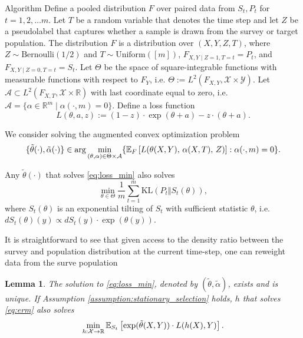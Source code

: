 \documentclass{article}
\theoremstyle{definition}
\theoremstyle{plain}
\newtheorem{lemm}[prop]{Lemma}
\theoremstyle{remark}
\begin{document}
\begin{section}{Algorithm}
Define a pooled distribution $F$ over paired data from $S_{t}, P_{t}$ for $t=1, 2, \dots m$. Let $T$ be a random variable that denotes the time step and let $Z$ be a pseudolabel that captures whether a sample is drawn from the survey or target population. The distribution $F$ is a distribution over $(X, Y, Z, T)$, where $Z  \sim \text{Bernoulli}(1/2)$ and $T \sim \text{Uniform}([m])$, $F_{X, Y \mid Z=1, T=t} = P_{t}$, and  $F_{X, Y \mid Z= 0, T=t} = S_{t}$. Let $\Theta$ be the space of square-integrable functions with measurable functions with respect to $F_{Y}$, i.e. $\Theta := L^{2}(F_{X, Y}, \mathcal{X} \times \mathcal{Y}).$ Let $\mathcal{A} \subset L^{2}(F_{X, T}, \mathcal{X} \times \mathbb{R})$ with last coordinate equal to zero, i.e. $\mathcal{A} =  \{ \alpha \in \mathbb{R}^{m} \mid \alpha(\cdot, m) = 0\}.$ 
Define a loss function 
\begin{equation} L(\theta, a, z) := (1 - z) \cdot \exp(\theta + a) - z \cdot (\theta + a).\end{equation}

We consider solving the augmented convex optimization problem
\begin{equation} 
\label{eq:loss_min}
\{\tilde{\theta}(\cdot), \tilde{\alpha}(\cdot)\} \in \arg\min_{(\theta, \alpha) \in \Theta \times \mathcal{A}} \{\EE[F]{L(\theta(X, Y),\, \alpha(X, T),\, Z)}: \alpha(\cdot, m) = 0\}.\end{equation}

Any $\tilde{\theta}(\cdot)$ that solves \eqref{eq:loss_min} also solves
\begin{equation}
\label{eq:kl_min}
\min_{\theta \in \Theta} \frac{1}{m} \sum_{t=1}^{m} \textrm{KL}(P_{t} \Vert S_{t}(\theta)),
\end{equation}
where $S_{t}(\theta)$ is an exponential tilting of $S_{t}$ with sufficient statistic $\theta$, i.e. $dS_{t}(\theta)(y) \propto dS_{t}(y) \cdot \exp(\theta(y))$.

It is straightforward to see that given access to the density ratio between the survey and population distribution at the current time-step, one can reweight data from the surve population 

\begin{lemm}
\label{lemm:existence_uniqueness}
The solution to \eqref{eq:loss_min}, denoted by $(\tilde{\theta}, \tilde{\alpha})$, exists and is unique. If Assumption \ref{assumption:stationary_selection} holds, $h$ that solves \eqref{eq:erm} also solves
\[ \min_{h: \mathcal{X} \rightarrow \mathbb{R}} \EE[S_{t}]{\exp(\tilde{\theta}(X, Y)) \cdot L(h(X), Y)}.\]
\end{lemm}


\end{section}
\end{document}
